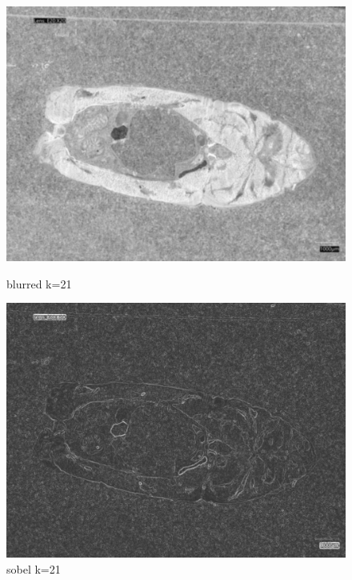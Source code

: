 \begin{figure}
    \centering
    \begin{minipage}{0.45\textwidth}
        \centering
        \includegraphics[width=\textwidth]{./fig/gausssian/blurred21.jpg}
        \caption{blurred k=21}
        \label{fig:blurred21}
    \end{minipage}
    \begin{minipage}{0.45\textwidth}
        \centering
        \includegraphics[width=\textwidth]{./fig/gausssian/sobel21.jpg}
        \caption{sobel k=21}
        \label{fig:sobel21}
    \end{minipage}
\end{figure}

